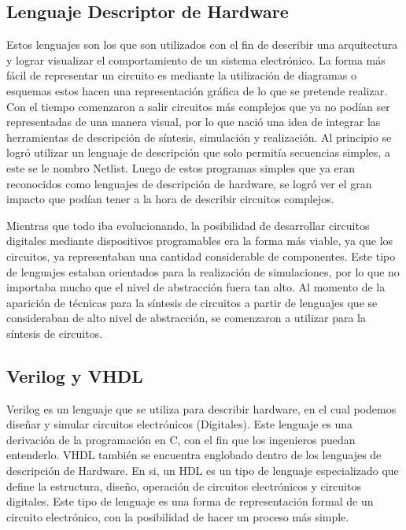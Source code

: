 \subsection*{Lenguaje Descriptor de Hardware}

Estos lenguajes son los que son utilizados con el fin de describir una arquitectura y lograr visualizar el comportamiento de un sistema electrónico. 
La forma más fácil de representar un circuito es mediante la utilización de diagramas o esquemas estos hacen una representación gráfica de lo que se pretende realizar. 
Con el tiempo comenzaron a salir circuitos más complejos que ya no podían ser representadas de una manera visual, por lo que nació una idea de integrar las herramientas de descripción de síntesis, simulación y realización. Al principio se logró utilizar un lenguaje de descripción que solo permitía secuencias simples, a este se le nombro Netlist. Luego de estos programas simples que ya eran reconocidos como lenguajes de descripción de hardware, se logró ver el gran impacto que podían tener a la hora de describir circuitos complejos.

Mientras que todo iba evolucionando, la posibilidad de desarrollar circuitos digitales mediante dispositivos programables era la forma más viable, ya que los circuitos, ya representaban una cantidad considerable de componentes. Este tipo de lenguajes estaban orientados para la realización de simulaciones, por lo que no importaba mucho que el nivel de abstracción fuera tan alto. Al momento de la aparición de técnicas para la síntesis de circuitos a partir de lenguajes que se consideraban de alto nivel de abstracción, se comenzaron a utilizar para la síntesis de circuitos.

\cite{DDH} 

\subsection*{Verilog y VHDL}

Verilog es un lenguaje que se utiliza para describir hardware, en el cual podemos diseñar y simular circuitos electrónicos (Digitales). Este lenguaje es una derivación de la programación en C, con el fin que los ingenieros puedan entenderlo. 
 VHDL también se encuentra englobado dentro de los lenguajes de descripción de Hardware. En si, un HDL es un tipo de lenguaje especializado que define la estructura, diseño, operación de circuitos electrónicos y circuitos digitales.
 Este tipo de lenguaje es una forma de representación formal de un circuito electrónico, con la posibilidad de hacer un proceso más simple.
 
